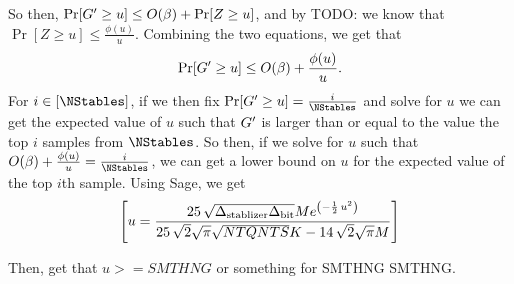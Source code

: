 So then, 
$
	\Pr[G' \geq u] \leq O(\beta) + \Pr[Z \geq u]
$,
and by TODO: we know that $\Pr[Z \geq u] \leq \frac{\phi(u)}{u}$. Combining the two equations,
we get that 
$$
	\Pr[G' \geq u] \leq O(\beta) + \frac{\phi(u)}{u}.
$$
For $i \in [\NStables]$, if we then fix $\Pr[\genscoreRVCorrected \geq u] = \frac{i}{\NStables}$
and solve for $u$ we can get the expected value of $u$ such that $G'$ is larger than
or equal to the value the top $i$ samples from $\NStables$.
So then, if we solve for $u$ such that $O(\beta) + \frac{\phi(u)}{u} = \frac{i}{\NStables}$,
we can get a lower bound on $u$ for the expected value of the top $i$th sample.
Using Sage, we get 
$$
\left[u = \frac{25 \, \sqrt{{{\Delta_{\text{stablizer}}}} {{\Delta_{\text{bit}}}}} M e^{\left(-\frac{1}{2} \, u^{2}\right)}}{25 \, \sqrt{2} \sqrt{\pi} \sqrt{{NTQ} {NTS}} K - 14 \, \sqrt{2} \sqrt{\pi} M}\right]
$$

Then, get that $u >= SMTHNG $ or something for SMTHNG SMTHNG.






